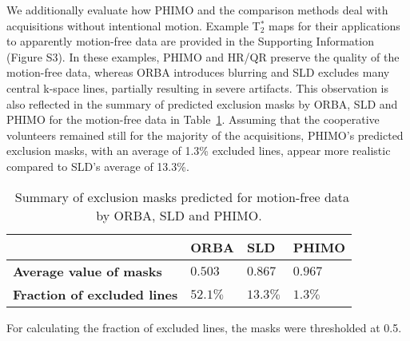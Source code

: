\documentclass[AMA,STIX2COL]{MRM}
\newcommand{\tstar}[1]{{T$_2^*$}}
\begin{document}
We additionally evaluate how PHIMO and the comparison methods deal with acquisitions without intentional motion. Example \tstar{} maps for their applications to apparently motion-free data are provided in the Supporting Information (Figure S3). In these examples, PHIMO and HR/QR preserve the quality of the motion-free data, whereas ORBA introduces blurring and SLD excludes many central k-space lines, partially resulting in severe artifacts.
This observation is also reflected in the summary of predicted exclusion masks by ORBA, SLD and PHIMO for the motion-free data in Table~\ref{tab:metrics_comparison}. Assuming that the cooperative volunteers remained still for the majority of the acquisitions, PHIMO's predicted exclusion masks, with an average of 1.3\% excluded lines, appear more realistic compared to SLD's average of 13.3\%.

\begin{table}[t]
\caption{\ Summary of exclusion masks predicted for motion-free data by ORBA, SLD and PHIMO.}
\centering
\begin{tabular}{@{}p{2.5cm}p{1.5cm}p{1.5cm}p{1.5cm}@{}}
\toprule
\textbf{} & \textbf{ORBA} & \textbf{SLD} & \textbf{PHIMO} \\ \midrule
\raggedright \textbf{Average value of masks}          & $0.503$ & $0.867$ & $0.967$ \\
\raggedright \textbf{Fraction of excluded lines} & $52.1 \%$ & $13.3\%$ & $1.3\%$ \\
\bottomrule
\end{tabular}
\begin{tablenotes}
\item For calculating the fraction of excluded lines, the masks were thresholded at 0.5.
\end{tablenotes}
\label{tab:metrics_comparison}
\end{table}
\end{document}
